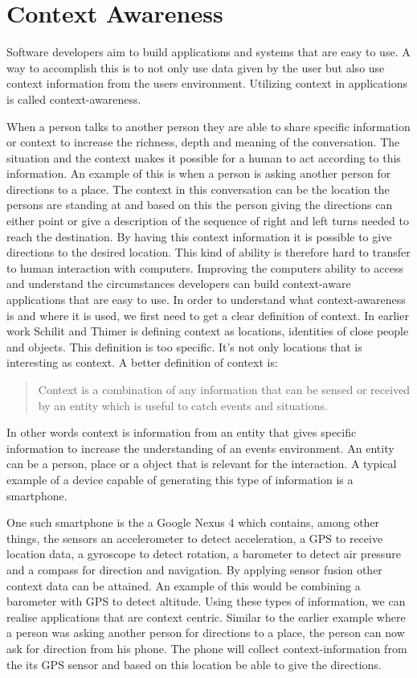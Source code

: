 \section{Context Awareness}
Software developers aim to build applications and systems that are easy to use. A way to accomplish this is to not only use data given by the user but also use context information from the users environment. Utilizing context in applications is called context-awareness.

When a person talks to another person they are able to share specific information or context to increase the richness, depth and meaning of the conversation. The situation and the context makes it possible for a human to act according to this information. 
An example of this is when a person is asking another person for directions to a place. The context in this conversation can be the location the persons are standing at and based on this the person giving the directions can either point or give a description of the sequence of right and left turns needed to reach the destination. By having this context information it is possible to give directions to the desired location. This kind of ability is therefore hard to transfer to human interaction with computers. Improving the computers ability to access and understand the circumstances developers can build context-aware applications that are easy to use. In order to understand what context-awareness is and where it is used, we first need to get a clear definition of context.
In earlier work Schilit and Thimer \cite{schilit1994disseminating} is defining context as locations, identities of close people and objects. This definition is too specific. It's not only locations that is interesting as context. A better definition of context is:

\begin{quotation}
Context is a combination of any information that can be sensed or received by an entity which is useful to catch events and situations. \cite{dey2001understanding}
\end{quotation}

In other words context is information from an entity that gives specific information to increase the understanding of an events environment. An entity can be a person, place or a object that is relevant for the interaction. A typical example of a device capable of generating this type of information is a smartphone.

One such smartphone is the a Google Nexus 4 \cite{GoogleNexus} which contains, among other things, the sensors an accelerometer to detect acceleration, a GPS to receive location data, a gyroscope to detect rotation, a barometer to detect air pressure and a compass for direction and navigation. By applying sensor fusion \cite{Elmenreich02sensorfusion} other context data can be attained. An example of this would be combining a barometer with GPS to detect altitude. Using these types of information, we can realise applications that are context centric. Similar to the earlier example where a person was asking another person for directions to a place, the person can now ask for direction from his phone. The phone will collect context-information from the its GPS sensor and based on this location be able to give the directions.

